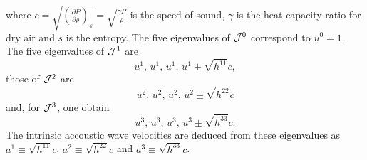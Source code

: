 \documentclass[12pt]{article}
\begin{document}
where $c = \sqrt{\left(\frac{\partial P}{\partial\rho}\right)_s} = \sqrt{\frac{\gamma P}{\rho}}$ is the speed of sound, $\gamma$ is the heat capacity ratio for dry air and $s$ is the entropy.
The five eigenvalues of ${\cal J}^0$ correspond to $u^0=1$. The five eigenvalues of ${\cal J}^1$ are
\begin{equation}\label{eq:eig_flux1}
u^1, \, u^1, \,u^1, \,u^1 \pm \sqrt{h^{11}} c,
\end{equation}
those of ${\cal J}^2$ are
\begin{equation}\label{eq:eig_flux2}
u^2, \, u^2, \, u^2, \, u^2 \pm \sqrt{h^{22}} c
\end{equation}
and, for ${\cal J}^3$, one obtain
\begin{equation}\label{eq:eig_flux3}
u^3, \, u^3, \, u^3, \, u^3 \pm \sqrt{h^{33}} c.
\end{equation}
The intrinsic accoustic wave velocities are deduced from these eigenvalues as $a^1 \equiv \sqrt{h^{11}} c$, $a^2 \equiv \sqrt{h^{22}} c$ and $a^3 \equiv \sqrt{h^{33}} c$.
\end{document}
